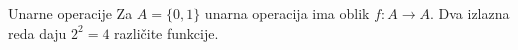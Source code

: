 \begin{frame}[label=01-s012]{Unarne operacije}
Za \(A=\{0,1\}\) unarna operacija ima oblik \(f:A\to A\). Dva izlazna reda daju \(2^2=4\) različite funkcije.
\begin{center}\end{center}

\end{frame}
